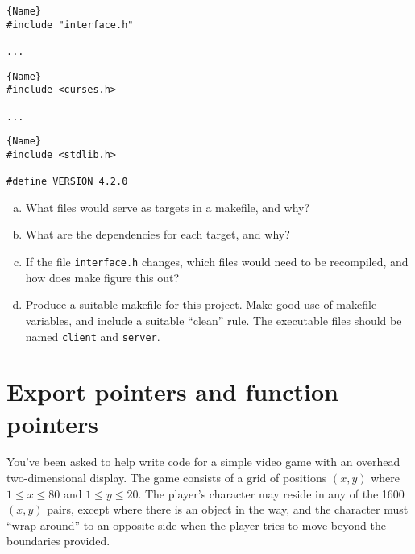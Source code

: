 \documentclass[a4paper,12pt]{article}
\begin{document}
\begin{minipage}{.3\textwidth}
\begin{lstlisting}[caption=interface.c,frame=tlrb]{Name}
#include "interface.h"

...
\end{lstlisting}
\end{minipage}\hfill
\begin{minipage}{.3\textwidth}
\begin{lstlisting}[caption=interface.h,frame=tlrb]{Name}
#include <curses.h>

...
\end{lstlisting}
\end{minipage}\hfill
\begin{minipage}{.3\textwidth}
\begin{lstlisting}[caption=common.h,frame=tlrb]{Name}
#include <stdlib.h>

#define VERSION 4.2.0
\end{lstlisting}
\end{minipage}

\begin{enumerate}[a)]
	\item What files would serve as targets in a makefile, and why?
	\item What are the dependencies for each target, and why?
	\item If the file \texttt{interface.h} changes, which files
	      would need to be recompiled, and how does make figure
	      this out?
	\item Produce a suitable makefile for this project. Make good
	      use of makefile variables, and include a suitable
	      “clean” rule. The executable files should be named
	      \texttt{client} and \texttt{server}.
\end{enumerate}

\newpage

\section{Export pointers and function pointers}

You’ve been asked to help write code for a simple video game with an
overhead two-dimensional display. The game consists of a grid of
positions $(x, y)$ where $1 \leq x \leq 80$ and $1 \leq y \leq 20$.
The player’s character may reside in any of the 1600 $(x, y)$ pairs,
except where there is an object in the way, and the character must
“wrap around” to an opposite side when the player tries to move beyond
the boundaries provided.
\end{document}
